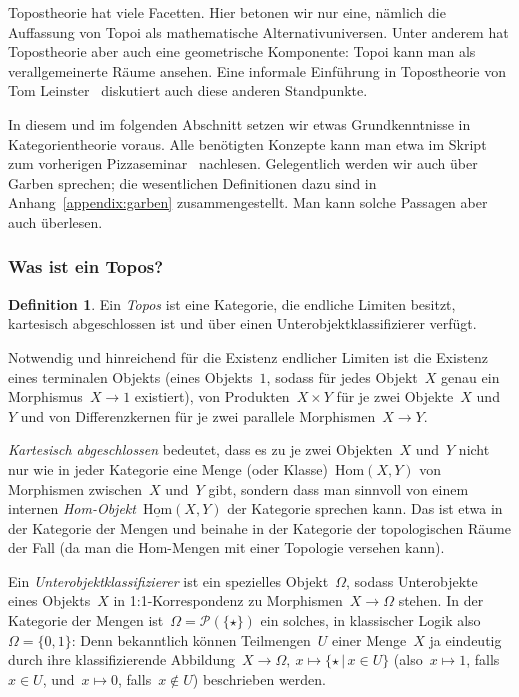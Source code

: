 \documentclass[a4paper,ngerman,12pt]{scrartcl}
\theoremstyle{definition}
\newtheorem{defn}{Definition}[section]
\theoremstyle{plain}
\theoremstyle{remark}
\renewcommand{\P}{\mathcal{P}}
\newcommand{\Hom}{\mathrm{Hom}}
\renewcommand{\_}{\mathpunct{.}\,}
\newcommand{\?}{\,{:}\,}
\begin{document}
\label{sect:topoi}%
Topostheorie hat viele Facetten. Hier betonen wir nur eine, nämlich
die Auffassung von Topoi als mathematische Alternativuniversen. Unter anderem
hat Topostheorie aber auch eine geometrische Komponente: Topoi kann man als
verallgemeinerte Räume ansehen. Eine informale Einführung in Topostheorie
von Tom Leinster~\cite{leinster:topos} diskutiert auch diese anderen
Standpunkte.

In diesem und im folgenden Abschnitt setzen wir etwas Grundkenntnisse in
Kategorientheorie voraus. Alle benötigten Konzepte kann man etwa im
Skript zum vorherigen Pizzaseminar~\cite{pizzaseminar:kategorientheorie}
nachlesen. Gelegentlich werden wir auch über Garben sprechen; die wesentlichen
Definitionen dazu sind in Anhang~\ref{appendix:garben} zusammengestellt. Man
kann solche Passagen aber auch überlesen.


\subsubsection*{Was ist ein Topos?}

\begin{defn}Ein \emph{Topos} ist eine Kategorie, die endliche Limiten besitzt,
kartesisch abgeschlossen ist und über einen Unterobjektklassifizierer verfügt.
\end{defn}

Notwendig und hinreichend für die Existenz endlicher Limiten ist die Existenz
eines terminalen Objekts (eines Objekts~$1$, sodass für jedes Objekt~$X$ genau
ein Morphismus~$X \to 1$ existiert), von Produkten~$X \times Y$ für je zwei
Objekte~$X$ und~$Y$ und von Differenzkernen für je zwei parallele Morphismen~$X
\to Y$.

\emph{Kartesisch abgeschlossen} bedeutet, dass es zu je zwei Objekten~$X$
und~$Y$ nicht nur wie in jeder Kategorie eine Menge (oder Klasse)~$\Hom(X,Y)$
von Morphismen zwischen~$X$ und~$Y$ gibt, sondern dass man sinnvoll von einem
internen \emph{Hom-Objekt}~$\underline{\Hom}(X,Y)$ der Kategorie sprechen kann.
Das ist etwa in der Kategorie der Mengen und beinahe in der Kategorie der
topologischen Räume der Fall (da man die Hom-Mengen mit einer Topologie
versehen kann).

Ein \emph{Unterobjektklassifizierer} ist ein spezielles Objekt~$\Omega$, sodass
Unterobjekte eines Objekts~$X$ in 1:1-Korrespondenz zu Morphismen~$X \to
\Omega$ stehen. In der Kategorie der Mengen ist~$\Omega = \P(\{\star\})$ ein solches, in
klassischer Logik also~$\Omega = \{ 0, 1 \}$: Denn bekanntlich
können Teilmengen~$U$ einer Menge~$X$ ja eindeutig durch ihre klassifizierende
Abbildung~$X \to \Omega,\ x \mapsto \{ \star \,|\, x \in U \}$ (also~$x \mapsto
1$, falls~$x \in U$, und~$x \mapsto 0$, falls~$x \not\in U$) beschrieben
werden.
\end{document}
